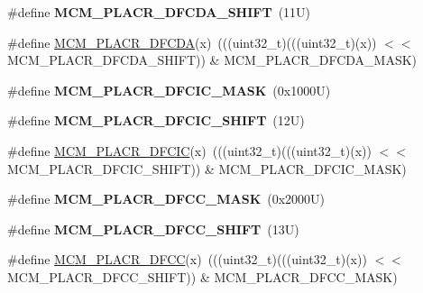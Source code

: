 \begin{DoxyCompactItemize}
\#define {\bfseries M\+C\+M\+\_\+\+P\+L\+A\+C\+R\+\_\+\+D\+F\+C\+D\+A\+\_\+\+S\+H\+I\+FT}~(11\+U)
\item 
\#define \mbox{\hyperlink{group___m_c_m___register___masks_gaaaf9605ea2614d154b1a52c1d5e1fa95}{M\+C\+M\+\_\+\+P\+L\+A\+C\+R\+\_\+\+D\+F\+C\+DA}}(x)~(((uint32\+\_\+t)(((uint32\+\_\+t)(x)) $<$$<$ M\+C\+M\+\_\+\+P\+L\+A\+C\+R\+\_\+\+D\+F\+C\+D\+A\+\_\+\+S\+H\+I\+FT)) \& M\+C\+M\+\_\+\+P\+L\+A\+C\+R\+\_\+\+D\+F\+C\+D\+A\+\_\+\+M\+A\+SK)
\item 
\mbox{\label{group___m_c_m___register___masks_ga4a3f9ffb612145266536e0de8e9fa432}} 
\#define {\bfseries M\+C\+M\+\_\+\+P\+L\+A\+C\+R\+\_\+\+D\+F\+C\+I\+C\+\_\+\+M\+A\+SK}~(0x1000\+U)
\item 
\mbox{\label{group___m_c_m___register___masks_gaff851bbdb5438d7e6c4816866107aec0}} 
\#define {\bfseries M\+C\+M\+\_\+\+P\+L\+A\+C\+R\+\_\+\+D\+F\+C\+I\+C\+\_\+\+S\+H\+I\+FT}~(12\+U)
\item 
\#define \mbox{\hyperlink{group___m_c_m___register___masks_gaea78222e8aeb890a6839ee0b1f1ced49}{M\+C\+M\+\_\+\+P\+L\+A\+C\+R\+\_\+\+D\+F\+C\+IC}}(x)~(((uint32\+\_\+t)(((uint32\+\_\+t)(x)) $<$$<$ M\+C\+M\+\_\+\+P\+L\+A\+C\+R\+\_\+\+D\+F\+C\+I\+C\+\_\+\+S\+H\+I\+FT)) \& M\+C\+M\+\_\+\+P\+L\+A\+C\+R\+\_\+\+D\+F\+C\+I\+C\+\_\+\+M\+A\+SK)
\item 
\mbox{\label{group___m_c_m___register___masks_ga3a3b01206691dd0da2cc1699d7aff12f}} 
\#define {\bfseries M\+C\+M\+\_\+\+P\+L\+A\+C\+R\+\_\+\+D\+F\+C\+C\+\_\+\+M\+A\+SK}~(0x2000\+U)
\item 
\mbox{\label{group___m_c_m___register___masks_ga43547ea594fc5be9183ff24f3bdcdee7}} 
\#define {\bfseries M\+C\+M\+\_\+\+P\+L\+A\+C\+R\+\_\+\+D\+F\+C\+C\+\_\+\+S\+H\+I\+FT}~(13\+U)
\item 
\#define \mbox{\hyperlink{group___m_c_m___register___masks_ga5bf8dc2c888bf70076373822caac47d4}{M\+C\+M\+\_\+\+P\+L\+A\+C\+R\+\_\+\+D\+F\+CC}}(x)~(((uint32\+\_\+t)(((uint32\+\_\+t)(x)) $<$$<$ M\+C\+M\+\_\+\+P\+L\+A\+C\+R\+\_\+\+D\+F\+C\+C\+\_\+\+S\+H\+I\+FT)) \& M\+C\+M\+\_\+\+P\+L\+A\+C\+R\+\_\+\+D\+F\+C\+C\+\_\+\+M\+A\+SK)
\item 
\mbox{\label{group___m_c_m___register___masks_ga90eea584eb5978a2ddfee057cd2fec28}} 
$$
\end{DoxyCompactItemize}
